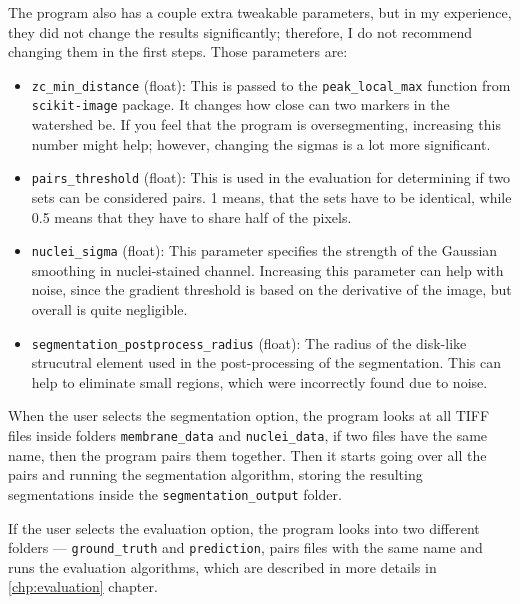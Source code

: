 \documentclass[
  digital,     %
  oneside,     %
  nosansbold,  %
  nocolorbold, %
  lof,         %
  lot,         %
]{fithesis4}
\begin{document}
The program also has a couple extra tweakable parameters, but in my experience,
they did not change the results significantly; therefore, I do not recommend
changing them in the first steps. Those parameters are:
\begin{itemize}
    \item \texttt{zc\_min\_distance} (float): This is passed to the
        \texttt{peak\_local\_max} function from \texttt{scikit-image} package.
        It changes how close can two markers in the watershed be. If you feel
        that the program is oversegmenting, increasing this number might help;
        however, changing the sigmas is a lot more significant.
    \item \texttt{pairs\_threshold} (float): This is used in the evaluation for
        determining if two sets can be considered pairs. 1 means, that the sets
        have to be identical, while 0.5 means that they have to share half of
        the pixels.
    \item \texttt{nuclei\_sigma} (float): This parameter specifies the strength
        of the Gaussian smoothing in nuclei-stained channel. Increasing this
        parameter can help with noise, since the gradient threshold is based on the
        derivative of the image, but overall is quite negligible.
    \item \texttt{segmentation\_postprocess\_radius} (float): The radius of the
        disk-like strucutral element used in the post-processing of the
        segmentation. This can help to eliminate small regions, which were
        incorrectly found due to noise.
\end{itemize}

When the user selects the segmentation option, the program looks at all TIFF
files inside folders \texttt{membrane\_data} and \texttt{nuclei\_data}, if two files have the
same name, then the program pairs them together. Then it starts going over all
the pairs and running the segmentation algorithm, storing the resulting
segmentations inside the \texttt{segmentation\_output} folder.

If the user selects the evaluation option, the program looks into two different
folders --- \texttt{ground\_truth} and \texttt{prediction}, pairs files with the
same name and runs the evaluation algorithms, which are described in more
details in \ref{chp:evaluation} chapter.
\end{document}
